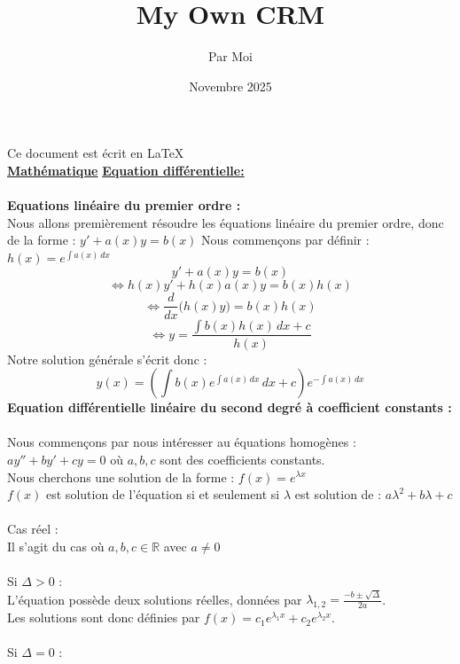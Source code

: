 \documentclass[12pt, letterpaper]{article}
\title{My Own CRM}
\author{Par Moi}
\date{Novembre 2025}
\begin{document}
\maketitle
\noindent Ce document est écrit en \LaTeX{}
\\

\hspace*{2em}\textbf{\underline{Mathématique}}
\newline
\newline
\textbf{\underline{Equation différentielle:}}
\\
\\
\textbf{Equations linéaire du premier ordre :}
\\
Nous allons premièrement résoudre les équations linéaire du premier ordre, donc de la forme : $y' + a(x)y = b(x)$
\newline
Nous commençons par définir : $h(x) = e^{\int a(x)\, dx}$
\newline
\[
y' + a(x)y = b(x) 
\]
\[
\Leftrightarrow h(x)y' + h(x)a(x)y = b(x)h(x)
\]
\[
\Leftrightarrow \frac{d}{dx} \biggl( h(x) y \biggr) = b(x) h(x)
\]
\[
\Leftrightarrow y = \frac{\int b(x)h(x)\, dx + c}{h(x)}
\]
\newline
Notre solution générale s'écrit donc :
\[
y(x) = \left(\int b(x)e^{\int a(x)\, dx}\, dx + c \right)e^{-\int a(x)\, dx}
\]
\newpage
\noindent\textbf{Equation différentielle linéaire du second degré à coefficient constants :}
\\
\\
Nous commençons par nous intéresser au équations homogènes : $ay'' + by' + cy = 0$ où $a,b,c$ sont des coefficients constants.
\\
Nous cherchons une solution de la forme : $f(x) = e^{\lambda x}$
\\
$f(x)$ est solution de l'équation si et seulement si $\lambda$ est solution de : $a\lambda^2 +b\lambda + c$
\\
\\
Cas réel :
\\
Il s'agit du cas où $a,b,c \in \mathbb{R}$ avec $a \neq 0$
\\
\\
Si $\Delta > 0$ : \\
L'équation possède deux solutions réelles, données par $\lambda_{1,2} = \frac{-b \pm \sqrt{\Delta}}{2a}$.
\\
Les solutions sont donc définies par $f(x) = c_1e^{\lambda_1 x} + c_2e^{\lambda_2 x}$.
\\
\\
Si $\Delta = 0$ : \\
\end{document}
